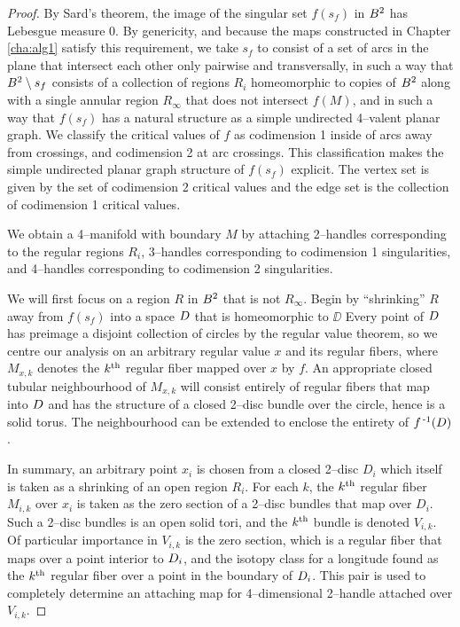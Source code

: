 \begin{proof}
	By Sard's theorem, the image of the singular set $f(s_f)$ in $B^2$ has Lebesgue measure 0.
	By genericity, and because the maps constructed in Chapter \ref{cha:alg1} satisfy this requirement, we take $s_f$ to consist of a set of arcs in the plane that intersect each other only pairwise and transversally, in such a way that $B^2\setminus s_f$ consists of a collection of regions $R_i$ homeomorphic to copies of $B^2$ along with a single annular region $R_\infty$ that does not intersect $f(M)$, and in such a way that $f(s_f)$ has a natural structure as a simple undirected 4--valent planar graph.
	We classify the critical values of $f$ as codimension 1 inside of arcs away from crossings, and codimension 2 at arc crossings.
	This classification makes the simple undirected planar graph structure of $f(s_f)$ explicit.
	The vertex set is given by the set of codimension 2 critical values and the edge set is the collection of codimension 1 critical values.
	
	We obtain a 4--manifold with boundary $M$ by attaching 2--handles corresponding to the regular regions $R_i$, 3--handles corresponding to codimension 1 singularities, and 4--handles corresponding to codimension 2 singularities.
	
	We will first focus on a region $R$ in $B^2$ that is not $R_\infty$.
	Begin by ``shrinking'' $R$ away from $f(s_f)$ into a space $D$ that is homeomorphic to $\DD$
	Every point of $D$ has preimage a disjoint collection of circles by the regular value theorem, so we centre our analysis on an arbitrary regular value $x$ and its regular fibers, where $M_{x,k}$ denotes the $k^{\text{th}}$ regular fiber mapped over $x$ by $f$.
	An appropriate closed tubular neighbourhood of $M_{x,k}$ will consist entirely of regular fibers that map into $D$ and has the structure of a closed 2--disc bundle over the circle, hence is a solid torus.
	The neighbourhood can be extended to enclose the entirety of $f^{\,\text{-}1}(D)$.
	
	In summary, an arbitrary point $x_i$ is chosen from a closed 2--disc $D_i$ which itself is taken as a shrinking of an open region $R_i$.
	For each $k$, the $k^{\text{th}}$ regular fiber $M_{i,k}$ over $x_i$ is taken as the zero section of a 2--disc bundles that map over $D_i$.
	Such a 2--disc bundles is an open solid tori, and the $k^{\text{th}}$ bundle is denoted $V_{i,k}$.
	Of particular importance in $V_{i,k}$ is the zero section, which is a regular fiber that maps over a point interior to $D_i$, and the isotopy class for a longitude found as the $k^{\text{th}}$ regular fiber over a point in the boundary of $D_i$.
	This pair is used to completely determine an attaching map for 4--dimensional 2--handle attached over $V_{i,k}$.
	

\end{proof}
